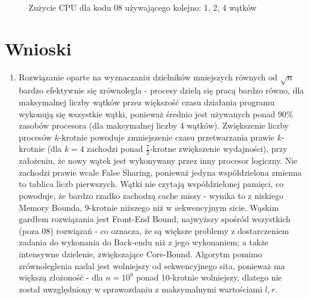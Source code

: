 \documentclass[12pt]{article}
\begin{document}
\begin{figure}[h!]
\begin{subfigure}[b]{0.32\linewidth}
	\end{subfigure}
	\caption{Zużycie CPU dla kodu 08 używającego kolejno: 1, 2, 4 wątków}
\end{figure}

\section{Wnioski}
\begin{enumerate}

	\item Rozwiązanie oparte na wyznaczaniu dzielników mniejszych równych od \(\sqrt{n}\) bardzo efektywnie się zrównolegla - procesy dzielą się pracą bardzo równo, dla maksymalnej liczby wątków przez większość czasu działania programu wykonują się wszystkie wątki, ponieważ średnio jest używanych ponad 90\% zasobów procesora (dla maksymalnej liczby 4 wątków). Zwiększenie liczby procesów \(k\)-krotnie powoduje zmniejszenie czasu przetwarzania prawie \(k\)-krotnie (dla \(k=4\) zachodzi ponad \(\frac{7}{2}\)-krotne zwiększenie wydajności), przy założeniu, że nowy wątek jest wykonywany przez inny procesor logiczny. Nie zachodzi prawie wcale False Sharing, ponieważ jedyna współdzielona zmienna to tablica liczb pierwszych. Wątki nie czytają współdzielonej pamięci, co powoduje, że bardzo rzadko zachodzą cache missy - wynika to z niskiego Memory Bounda, 9-krotnie niższego niż w sekwencyjnym sicie. Wąskim gardłem rozwiązania jest Front-End Bound, najwyższy spośród wszystkich (poza 08) rozwiązań - co oznacza, że są większe problemy z dostarczeniem zadania do wykonania do Back-endu niż z jego wykonaniem; a także intensywne dzielenie, zwiększające Core-Bound. Algorytm pomimo zrównoleglenia nadal jest wolniejszy od sekwencyjnego sita, ponieważ ma większą złożoność - dla \(n=10^9\) ponad 10-krotnie wolniejszy, dlatego nie został uwzględniony w sprawozdaniu z maksymalnymi wartościami \(l, r\).


\end{enumerate}
\end{document}
